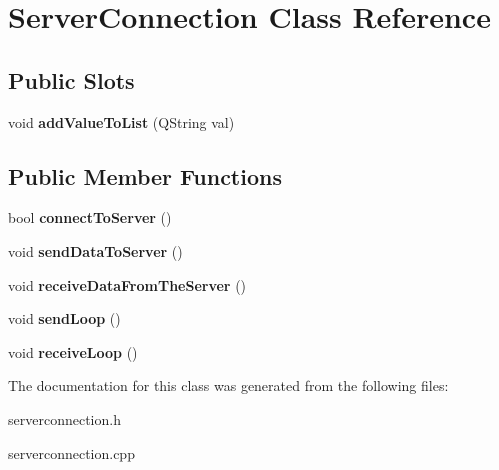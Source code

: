 \hypertarget{class_server_connection}{\section{Server\-Connection Class Reference}
\label{class_server_connection}
}
\subsection*{Public Slots}
\begin{DoxyCompactItemize}
\item 
\hypertarget{class_server_connection_a612fa1bbe3fdc8b9a681d6c815de8edb}{void {\bfseries add\-Value\-To\-List} (Q\-String val)}\label{class_server_connection_a612fa1bbe3fdc8b9a681d6c815de8edb}

\end{DoxyCompactItemize}
\subsection*{Public Member Functions}
\begin{DoxyCompactItemize}
\item 
\hypertarget{class_server_connection_acfa91a44f25e32e060cccbf94041ca1a}{bool {\bfseries connect\-To\-Server} ()}\label{class_server_connection_acfa91a44f25e32e060cccbf94041ca1a}

\item 
\hypertarget{class_server_connection_a9fc0648ff79e5b87cc984244ea4fd883}{void {\bfseries send\-Data\-To\-Server} ()}\label{class_server_connection_a9fc0648ff79e5b87cc984244ea4fd883}

\item 
\hypertarget{class_server_connection_af5c671bdc27fb86e3947c6ad7c93e4b1}{void {\bfseries receive\-Data\-From\-The\-Server} ()}\label{class_server_connection_af5c671bdc27fb86e3947c6ad7c93e4b1}

\item 
\hypertarget{class_server_connection_a2cfffa24dc488a2e2dc8a2972c13b8b3}{void {\bfseries send\-Loop} ()}\label{class_server_connection_a2cfffa24dc488a2e2dc8a2972c13b8b3}

\item 
\hypertarget{class_server_connection_aee726f80dccf32033c409a7789577f78}{void {\bfseries receive\-Loop} ()}\label{class_server_connection_aee726f80dccf32033c409a7789577f78}

\end{DoxyCompactItemize}


The documentation for this class was generated from the following files\-:\begin{DoxyCompactItemize}
\item 
serverconnection.\-h\item 
serverconnection.\-cpp\end{DoxyCompactItemize}
